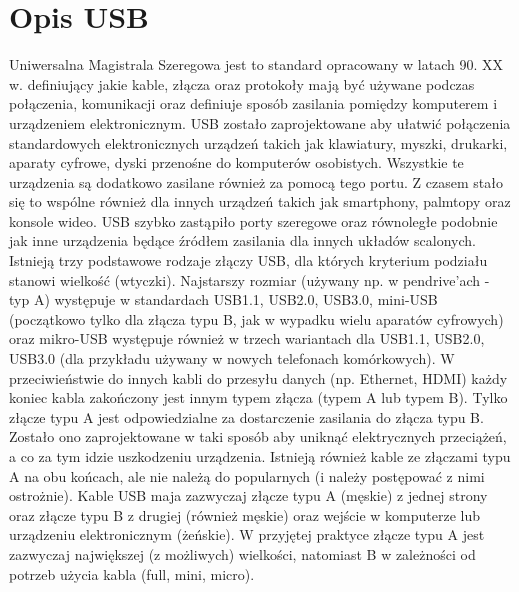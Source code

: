 \documentclass{BscUS}
\begin{document}
\section{Opis USB}
\label{USBStandardChapter}
Uniwersalna Magistrala Szeregowa jest to standard opracowany w latach 90. XX w. definiujący jakie kable, złącza oraz protokoły mają być używane podczas połączenia, komunikacji oraz definiuje sposób zasilania pomiędzy komputerem i urządzeniem elektronicznym. USB zostało zaprojektowane aby ułatwić połączenia standardowych elektronicznych urządzeń takich jak klawiatury, myszki, drukarki, aparaty cyfrowe, dyski przenośne do komputerów osobistych. Wszystkie te urządzenia są dodatkowo zasilane również za pomocą tego portu. Z czasem stało się to wspólne również dla innych urządzeń takich jak smartphony, palmtopy oraz konsole wideo.\cite{USBSystemArch, USB20Doc, USB30Doc}
\newline
\indent USB szybko zastąpiło porty szeregowe oraz równoległe podobnie jak inne urządzenia będące źródłem zasilania dla innych układów scalonych. Istnieją trzy podstawowe rodzaje złączy USB, dla których kryterium podziału stanowi wielkość (wtyczki). Najstarszy rozmiar (używany np. w pendrive'ach - typ A) występuje w standardach USB1.1, USB2.0, USB3.0, mini-USB (początkowo tylko dla złącza typu B, jak w wypadku wielu aparatów cyfrowych) oraz mikro-USB występuje również w trzech wariantach dla USB1.1, USB2.0, USB3.0 (dla przykładu używany w nowych telefonach komórkowych). 
\newline
\indent W przeciwieństwie do innych kabli do przesyłu danych (np. Ethernet, HDMI) każdy koniec kabla zakończony jest innym typem złącza (typem A lub typem B). Tylko złącze typu A jest odpowiedzialne za dostarczenie zasilania do złącza typu B. Zostało ono zaprojektowane w taki sposób aby uniknąć elektrycznych przeciążeń, a co za tym idzie uszkodzeniu urządzenia. Istnieją również kable ze złączami typu A na obu końcach, ale nie należą do popularnych (i należy postępować z nimi ostrożnie). Kable USB maja zazwyczaj złącze typu A (męskie) z jednej strony oraz złącze typu B z drugiej (również męskie) oraz wejście w komputerze lub urządzeniu elektronicznym (żeńskie). W przyjętej praktyce złącze typu A jest zazwyczaj największej (z możliwych) wielkości, natomiast B w zależności od potrzeb użycia kabla (full, mini, micro). \cite{USBSystemArch, USB20Doc, USB30Doc, DevUSBPher}
\end{document}
